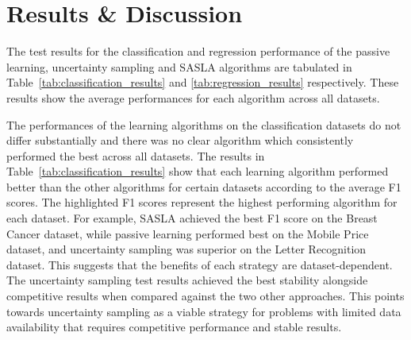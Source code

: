 \documentclass[conference]{IEEEtran}
\begin{document}
	\section{Results \& Discussion}\label{RD}
	The test results for the classification and regression performance of the passive learning, uncertainty sampling and SASLA algorithms are tabulated in Table~\ref{tab:classification_results} and \ref{tab:regression_results} respectively. These results show the average performances for each algorithm across all datasets. 
	
	The performances of the learning algorithms on the classification datasets do not differ substantially and there was no clear algorithm which consistently performed the best across all datasets. The results in Table~\ref{tab:classification_results} show that each learning algorithm performed better than the other algorithms for certain datasets according to the average F1 scores. The highlighted F1 scores represent the highest performing algorithm for each dataset. For example, SASLA achieved the best F1 score on the Breast Cancer dataset, while passive learning performed best on the Mobile Price dataset, and uncertainty sampling was superior on the Letter Recognition dataset. This suggests that the benefits of each strategy are dataset-dependent. The uncertainty sampling test results achieved the best stability alongside competitive results when compared against the two other approaches. This points towards uncertainty sampling as a viable strategy for problems with limited data availability that requires competitive performance and stable results. 
	
\end{document}

